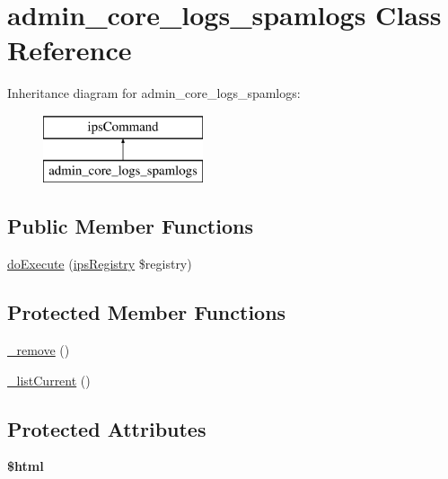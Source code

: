 \hypertarget{classadmin__core__logs__spamlogs}{\section{admin\-\_\-core\-\_\-logs\-\_\-spamlogs Class Reference}
\label{classadmin__core__logs__spamlogs}
}
Inheritance diagram for admin\-\_\-core\-\_\-logs\-\_\-spamlogs\-:\begin{figure}[H]
\begin{center}
\leavevmode
\includegraphics[height=2.000000cm]{classadmin__core__logs__spamlogs}
\end{center}
\end{figure}
\subsection*{Public Member Functions}
\begin{DoxyCompactItemize}
\item 
\hyperlink{classadmin__core__logs__spamlogs_afbc4e912a0604b94d47d66744c64d8ba}{do\-Execute} (\hyperlink{classips_registry}{ips\-Registry} \$registry)
\end{DoxyCompactItemize}
\subsection*{Protected Member Functions}
\begin{DoxyCompactItemize}
\item 
\hyperlink{classadmin__core__logs__spamlogs_a6e3a0c448dcfd8610c6ddf42c6c660aa}{\-\_\-remove} ()
\item 
\hyperlink{classadmin__core__logs__spamlogs_abc03e9ca0857dea04554a012ac374f5a}{\-\_\-list\-Current} ()
\end{DoxyCompactItemize}
\subsection*{Protected Attributes}
\begin{DoxyCompactItemize}
\item 
\hypertarget{classadmin__core__logs__spamlogs_a6f96e7fc92441776c9d1cd3386663b40}{{\bfseries \$html}}\label{classadmin__core__logs__spamlogs_a6f96e7fc92441776c9d1cd3386663b40}

\end{DoxyCompactItemize}
